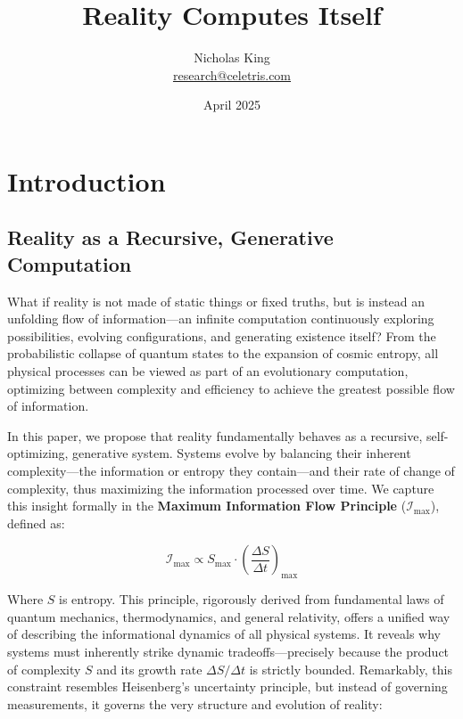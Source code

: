 \documentclass[12pt]{article}
\begin{document}
\title{Reality Computes Itself}
\author{Nicholas King \\ \href{mailto:research@celetris.com}{research@celetris.com}}
\date{April 2025}

\maketitle

\section{Introduction}

\subsection{Reality as a Recursive, Generative Computation}

What if reality is not made of static things or fixed truths, but is instead an unfolding flow of information—an infinite computation continuously exploring possibilities, evolving configurations, and generating existence itself? From the probabilistic collapse of quantum states to the expansion of cosmic entropy, all physical processes can be viewed as part of an evolutionary computation, optimizing between complexity and efficiency to achieve the greatest possible flow of information.

In this paper, we propose that reality fundamentally behaves as a recursive, self-optimizing, generative system. Systems evolve by balancing their inherent complexity—the information or entropy they contain—and their rate of change of complexity, thus maximizing the information processed over time. We capture this insight formally in the \textbf{Maximum Information Flow Principle} ($\mathcal{I}_{\text{max}}$), defined as:

\begin{equation}
    \mathcal{I}_{\text{max}} \propto S_{\text{max}} \cdot \left(\frac{\Delta S}{\Delta t}\right)_{\text{max}}
\end{equation}

Where $S$ is entropy. This principle, rigorously derived from fundamental laws of quantum mechanics, thermodynamics, and general relativity, offers a unified way of describing the informational dynamics of all physical systems. It reveals why systems must inherently strike dynamic tradeoffs—precisely because the product of complexity \( S \) and its growth rate \(\Delta S / \Delta t\) is strictly bounded. Remarkably, this constraint resembles Heisenberg's uncertainty principle, but instead of governing measurements, it governs the very structure and evolution of reality:
\end{document}
